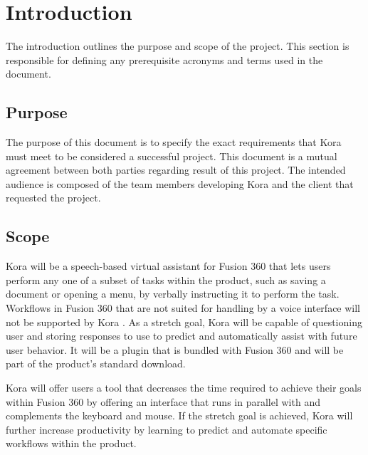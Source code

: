 \documentclass[onecolumn, draftclsnofoot,10pt, compsoc]{IEEEtran}
\def \botname{Kora }
\begin{document}
\newpage
{}
\tableofcontents
\clearpage

\section{Introduction}
        The introduction outlines the purpose and scope of the project. 
        This section is responsible for defining any prerequisite acronyms and terms used in the document. 
    \subsection{Purpose}
        The purpose of this document is to specify the exact requirements that \botname must meet to be considered a successful project. 
        This document is a mutual agreement between both parties regarding result of this project.
        The intended audience is composed of the team members developing \botname and the client that requested the project.
    \subsection{Scope}
        \botname will be a speech-based virtual assistant for Fusion 360 that lets users perform any one of a subset of tasks within the product, such as saving a document or opening a menu, by verbally instructing it to perform the task.
        Workflows in Fusion 360 that are not suited for handling by a voice interface will not be supported by \botname.
        As a stretch goal, \botname will be capable of questioning user and storing responses to use to predict and automatically assist with future user behavior.
        It will be a plugin that is bundled with Fusion 360 and will be part of the product's standard download.

        \botname will offer users a tool that decreases the time required to achieve their goals within Fusion 360 by offering an interface that runs in parallel with and complements the keyboard and mouse.
        If the stretch goal is achieved, \botname will further increase productivity by learning to predict and automate specific workflows within the product.
        
\end{document}
